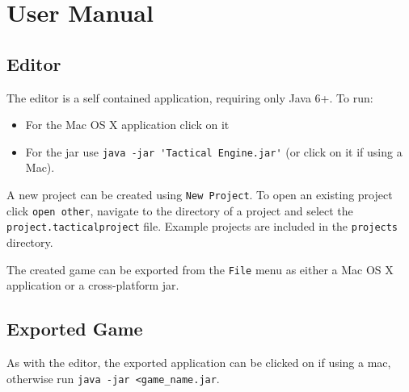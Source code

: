 \section{User Manual}

\subsection{Editor}
The editor is a self contained application, requiring only Java 6+.  To run:
\begin{itemize}
	\item For the Mac OS X application click on it
	\item For the jar use \lstinline{java -jar 'Tactical Engine.jar'} (or click on it if using a Mac).
\end{itemize}

\noindent A new project can be created using \texttt{New Project}. To open an existing project click \texttt{open other}, navigate to the directory of a project and select the \texttt{project.tacticalproject} file. Example projects are included in the \texttt{projects} directory.

The created game can be exported from the \texttt{File} menu as either a Mac OS X application or a cross-platform jar.

\subsection{Exported Game}
As with the editor, the exported application can be clicked on if using a mac, otherwise run \lstinline{java -jar <game_name.jar}.

